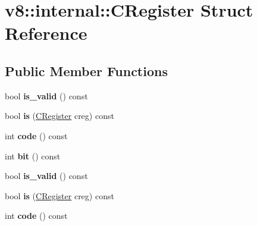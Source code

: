 \hypertarget{structv8_1_1internal_1_1_c_register}{}\section{v8\+:\+:internal\+:\+:C\+Register Struct Reference}
\label{structv8_1_1internal_1_1_c_register}
\subsection*{Public Member Functions}
\begin{DoxyCompactItemize}
\item 
bool {\bfseries is\+\_\+valid} () const \hypertarget{structv8_1_1internal_1_1_c_register_a6aba769bc6ee2fce1c5702ab51b1d0ac}{}\label{structv8_1_1internal_1_1_c_register_a6aba769bc6ee2fce1c5702ab51b1d0ac}

\item 
bool {\bfseries is} (\hyperlink{structv8_1_1internal_1_1_c_register}{C\+Register} creg) const \hypertarget{structv8_1_1internal_1_1_c_register_af7b2a162aa1e3f87c452854f0f32e595}{}\label{structv8_1_1internal_1_1_c_register_af7b2a162aa1e3f87c452854f0f32e595}

\item 
int {\bfseries code} () const \hypertarget{structv8_1_1internal_1_1_c_register_ab6d3af9fba89e69fa228a348c686552e}{}\label{structv8_1_1internal_1_1_c_register_ab6d3af9fba89e69fa228a348c686552e}

\item 
int {\bfseries bit} () const \hypertarget{structv8_1_1internal_1_1_c_register_a28cb314dbb3c321107f1175e2f40389c}{}\label{structv8_1_1internal_1_1_c_register_a28cb314dbb3c321107f1175e2f40389c}

\item 
bool {\bfseries is\+\_\+valid} () const \hypertarget{structv8_1_1internal_1_1_c_register_a6aba769bc6ee2fce1c5702ab51b1d0ac}{}\label{structv8_1_1internal_1_1_c_register_a6aba769bc6ee2fce1c5702ab51b1d0ac}

\item 
bool {\bfseries is} (\hyperlink{structv8_1_1internal_1_1_c_register}{C\+Register} creg) const \hypertarget{structv8_1_1internal_1_1_c_register_af7b2a162aa1e3f87c452854f0f32e595}{}\label{structv8_1_1internal_1_1_c_register_af7b2a162aa1e3f87c452854f0f32e595}

\item 
int {\bfseries code} () const \hypertarget{structv8_1_1internal_1_1_c_register_ab6d3af9fba89e69fa228a348c686552e}{}\label{structv8_1_1internal_1_1_c_register_ab6d3af9fba89e69fa228a348c686552e}


\end{DoxyCompactItemize}
